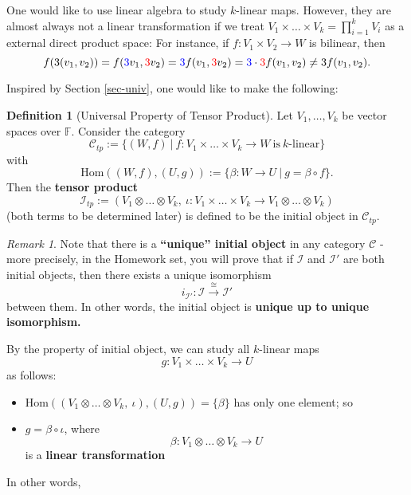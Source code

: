 \documentclass[11pt,openany]{book}
\theoremstyle{plain}
\theoremstyle{definition}
\newtheorem{definition}[definition]{Definition}
\theoremstyle{remark}
\newtheorem{remark}[remark]{Remark}
\begin{document}
One would like to use linear algebra to study $k$-linear maps. However, they are almost always not a linear transformation if we treat $V_1 \times \dots \times V_k = \prod_{i = 1}^k V_i$ as a external direct product space:
For instance, if $f : V_1 \times V_2 \to W$ is bilinear, then 
$$f(3(v_1,v_2)) = f({\color{blue} 3}v_1, {\color{red} 3}v_2) = {\color{blue} 3}f(v_1, {\color{red} 3}v_2) = {\color{blue} 3}\cdot {\color{red} 3}f(v_1,v_2) \neq 3f(v_1,v_2).$$

Inspired by Section \ref{sec-univ}, one would like to make the following:
\begin{definition}[Universal Property of Tensor Product] 
Let $V_1, \dots, V_k$ be vector spaces over $\mathbb{F}$. Consider the category
$$\mathcal{C}_{tp} := \{(W,f)\ |\ f: V_1 \times \dots \times V_k \to W\ \text{is}\ k\text{-linear}\}$$
with
$$\mathrm{Hom}((W,f),(U,g)) := \{\beta : W \to U\ |\ g = \beta \circ f\}.$$
Then the {\bf tensor product}
$$\mathcal{I}_{tp} := (V_1 \otimes \dots \otimes V_k,\ \iota: V_1 \times \dots \times V_k \to V_1 \otimes \dots \otimes V_k)$$
(both terms to be determined later) is defined to be the initial object in $\mathcal{C}_{tp}$.
\end{definition}

\begin{remark}
    Note that there is a {\bf ``unique'' initial object} in any category $\mathcal{C}$ - more precisely, in the Homework set, you will prove that
    if $\mathcal{I}$ and $\mathcal{I}'$ are both initial objects, then there exists a unique isomorphism
    $$i_{\mathcal{I}'}: \mathcal{I} \xrightarrow{\cong} \mathcal{I}'$$
    between them. In other words, the initial object is {\bf unique up to unique isomorphism.}
 \end{remark}

By the property of initial object, we can study all $k$-linear maps
$$g: V_1 \times \dots \times V_k \to U$$
as follows:
\begin{itemize}
    \item $\mathrm{Hom}((V_1 \otimes \dots \otimes V_k,\ \iota), (U,g)) = \{\beta\}$ has only one element; so
    \item $g = \beta \circ \iota$, where 
    $$\beta: V_1 \otimes \dots \otimes V_k \to U$$ 
    is a {\bf linear transformation}
\end{itemize}
In other words,
\begin{center}
\end{center}
\end{document}
